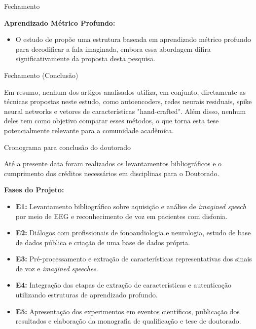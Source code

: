 \documentclass{beamer}
\begin{document}
\begin{frame}[allowframebreaks]{Fechamento}
		\par \textbf{Aprendizado Métrico Profundo:}
		\begin{itemize}
			\item O estudo de \cite{lee2021decoding} propõe uma estrutura baseada em aprendizado métrico profundo para decodificar a fala imaginada, embora essa abordagem difira significativamente da proposta desta pesquisa.
		\end{itemize}
	\end{frame}
	\begin{frame}{Fechamento (Conclusão)}
		\par Em resumo, nenhum dos artigos analisados utiliza, em conjunto, diretamente as técnicas propostas neste estudo, como autoencoders, redes neurais residuais, spike neural networks e vetores de características "hand-crafted". Além disso, nenhum deles tem como objetivo comparar esses métodos, o que torna esta tese potencialmente relevante para a comunidade acadêmica.
	\end{frame}

	\begin{frame}{Cronograma para conclusão do doutorado}
			\par Até a presente data foram realizados os levantamentos bibliográficos e o cumprimento dos créditos necessários em disciplinas para o Doutorado.
			
			\par \textbf{Fases do Projeto:}
			
			\begin{itemize}
				\item \textbf{E1:} Levantamento bibliográfico sobre aquisição e análise de \textit{imagined speech} por meio de EEG e reconhecimento de voz em pacientes com disfonia.
				\item \textbf{E2:} Diálogos com profissionais de fonoaudiologia e neurologia, estudo de base de dados pública e criação de uma base de dados própria.
				\item \textbf{E3:} Pré-processamento e extração de características representativas dos sinais de voz e \textit{imagined speeches}.
				\item \textbf{E4:} Integração das etapas de extração de características e autenticação utilizando estruturas de aprendizado profundo.
				\item \textbf{E5:} Apresentação dos experimentos em eventos científicos, publicação dos resultados e elaboração da monografia de qualificação e tese de doutorado.
			\end{itemize}
	\end{frame}
\end{document}
